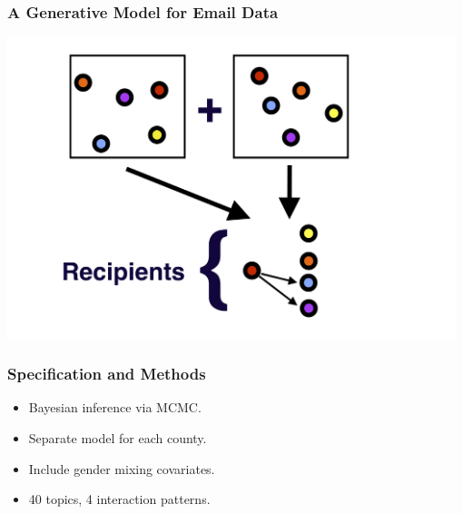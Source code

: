 \documentclass[xcolor={table}, fleqn]{beamer}
\newenvironment{changemargin}[2]{%
  \begin{list}{}{%
    \setlength{\topsep}{0pt}%
    \setlength{\leftmargin}{#1}%
    \setlength{\rightmargin}{#2}%
    \setlength{\listparindent}{\parindent}%
    \setlength{\itemindent}{\parindent}%
    \setlength{\parsep}{\parskip}%
  }%
  \item[]}{\end{list}}
\begin{document}
\begin{frame}\frametitle{A Generative Model for Email Data}
	\begin{changemargin}{-1cm}{ -1cm}
    \centering
	\includegraphics[width=0.98\textwidth]{images/Gen_Proc_3.png}
	\end{changemargin} 
\end{frame}

\begin{frame}\frametitle{Specification and Methods}
	\LARGE
	\begin{itemize}
		\item Bayesian inference via MCMC.
		\vspace*{.4in}
		\item Separate model for each county.
		\vspace*{.4in}
		\item Include gender mixing covariates.
		\vspace*{.4in}
		\item 40 topics, 4 interaction patterns.
	\end{itemize}
\end{frame}
\end{document}

